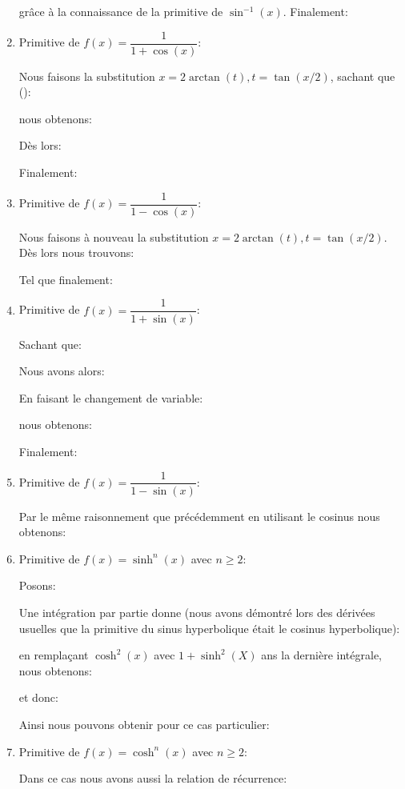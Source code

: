 \begin{enumerate}
		grâce à la connaissance de la primitive de $\sin^{-1}(x)$. Finalement:
		
		
		\item Primitive de $f(x)=\dfrac{1}{1+\cos(x)}$:
		
		Nous faisons la substitution $x=2\arctan(t),t=\tan(x/2)$, sachant que ():
		
		nous obtenons:
		
		Dès lors:
		
		Finalement:
		
		
		\item  Primitive de $f(x)=\dfrac{1}{1-\cos(x)}$:
		
		Nous faisons à nouveau la substitution $x=2\arctan(t),t=\tan(x/2)$. Dès lors nous trouvons:
		
		Tel que finalement:
		
		
		\item  Primitive de $f(x)=\dfrac{1}{1+\sin(x)}$:
		
		Sachant que:
		
		Nous avons alors:
		
		En faisant le changement de variable:
		
		nous obtenons:
		
		Finalement:
		
		
		\item  Primitive de $f(x)=\dfrac{1}{1-\sin(x)}$:
		
		Par le même raisonnement que précédemment en utilisant le cosinus nous obtenons:
		
		
		\item Primitive de $f(x)=\sinh^n(x)$ avec $n \geq 2$:
		
		Posons:
		
		Une intégration par partie donne (nous avons démontré lors des dérivées usuelles que la primitive du sinus hyperbolique était le cosinus hyperbolique):
		
		en remplaçant $\cosh^2(x)$ avec $1+\sinh^2(X)$ ans la dernière intégrale, nous obtenons:
		
		et donc:
		
		Ainsi nous pouvons obtenir pour ce cas particulier:
		 
		
		\item Primitive de $f(x)=\cosh^n(x)$ avec $n \geq 2$:
		
		Dans ce cas nous avons aussi la relation de récurrence:
		

\end{enumerate}
